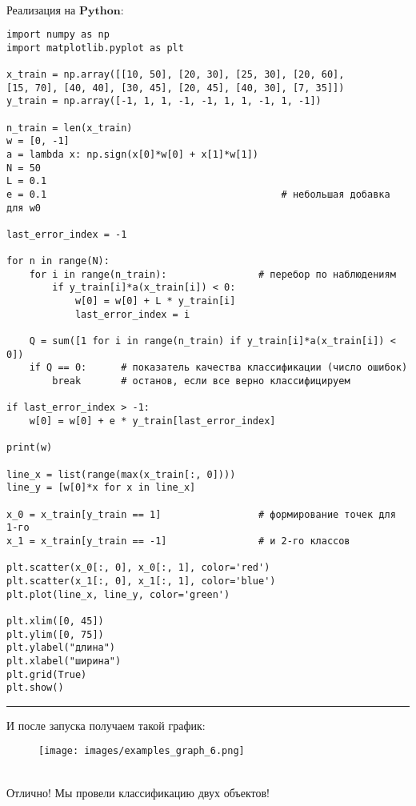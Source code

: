 \vspace*{0.3cm}
\(\textbf{Реализация на Python:}\)
\vspace*{0.3cm}
\begin{verbatim}
import numpy as np
import matplotlib.pyplot as plt

x_train = np.array([[10, 50], [20, 30], [25, 30], [20, 60],
[15, 70], [40, 40], [30, 45], [20, 45], [40, 30], [7, 35]])
y_train = np.array([-1, 1, 1, -1, -1, 1, 1, -1, 1, -1])

n_train = len(x_train)
w = [0, -1]
a = lambda x: np.sign(x[0]*w[0] + x[1]*w[1])
N = 50
L = 0.1
e = 0.1                                         # небольшая добавка для w0

last_error_index = -1

for n in range(N):
    for i in range(n_train):                # перебор по наблюдениям
        if y_train[i]*a(x_train[i]) < 0:
            w[0] = w[0] + L * y_train[i]
            last_error_index = i

    Q = sum([1 for i in range(n_train) if y_train[i]*a(x_train[i]) < 0])
    if Q == 0:      # показатель качества классификации (число ошибок)
        break       # останов, если все верно классифицируем

if last_error_index > -1:
    w[0] = w[0] + e * y_train[last_error_index]

print(w)

line_x = list(range(max(x_train[:, 0])))
line_y = [w[0]*x for x in line_x]

x_0 = x_train[y_train == 1]                 # формирование точек для 1-го
x_1 = x_train[y_train == -1]                # и 2-го классов

plt.scatter(x_0[:, 0], x_0[:, 1], color='red')
plt.scatter(x_1[:, 0], x_1[:, 1], color='blue')
plt.plot(line_x, line_y, color='green')

plt.xlim([0, 45])
plt.ylim([0, 75])
plt.ylabel("длина")
plt.xlabel("ширина")
plt.grid(True)
plt.show()

\end{verbatim}
\noindent\rule{\linewidth}{0.4pt}

И после запуска получаем такой график: \\

\begin{figure}[htbp]
        \centering
        \texttt{[image: images/examples\_graph\_6.png]}
        \label{fig:example_6}
\end{figure} \\

Отлично! Мы провели классификацию двух объектов!





